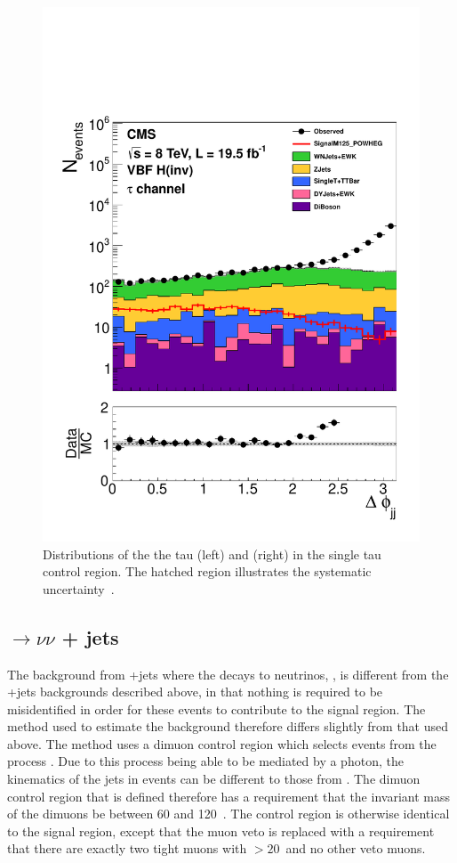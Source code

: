 \begin{figure}
  \includegraphics[width=.6\largefigwidth]{plots/prompt/AN-12-403-figs/hWTau_dPhiJJ.pdf}
  \caption{Distributions of the the tau \pt (left) and \dphijj (right) in the single tau control region. The hatched region illustrates the systematic uncertainty~\cite{ARTICLE:CMSAN-12-403}.}
  \label{fig:promptwtaunu}
\end{figure}

\subsection{\PZ$\rightarrow \nu\nu$ + jets}
\label{sec:promptznunu}
The background from \PZ+jets where the \PZ decays to neutrinos, \Znunu, is different from the \PW+jets backgrounds described above, in that nothing is required to be misidentified in order for these events to contribute to the signal region. The method used to estimate the \Znunu background therefore differs slightly from that used above. The method uses a dimuon control region which selects events from the process \Zmumu. Due to this process being able to be mediated by a photon, the kinematics of the jets in \Zmumu events can be different to those from \Znunu. The dimuon control region that is defined therefore has a requirement that the invariant mass of the dimuons be between 60 and 120 \GeV\,. The control region is otherwise identical to the signal region, except that the muon veto is replaced with a requirement that there are exactly two tight muons with \pt$>20$\GeV\, and no other veto muons.

